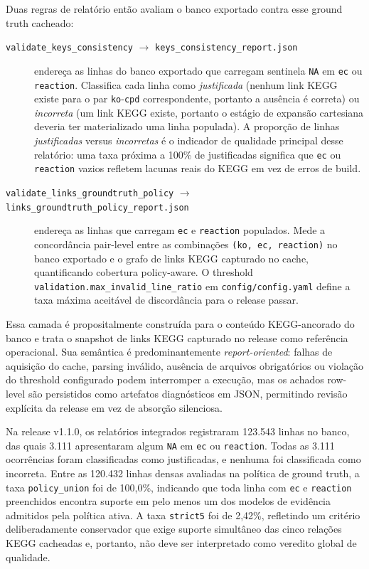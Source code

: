 Duas regras de relatório então avaliam o banco exportado contra esse ground truth cacheado:

\begin{description}
    \item[\texttt{validate\_keys\_consistency} $\rightarrow$ \texttt{keys\_consistency\_report.json}] endereça as linhas do banco exportado que carregam sentinela \texttt{NA} em \texttt{ec} ou \texttt{reaction}. Classifica cada linha como \textit{justificada} (nenhum link KEGG existe para o par \texttt{ko}-\texttt{cpd} correspondente, portanto a ausência é correta) ou \textit{incorreta} (um link KEGG existe, portanto o estágio de expansão cartesiana deveria ter materializado uma linha populada). A proporção de linhas \textit{justificadas} versus \textit{incorretas} é o indicador de qualidade principal desse relatório: uma taxa próxima a 100\% de justificadas significa que \texttt{ec} ou \texttt{reaction} vazios refletem lacunas reais do KEGG em vez de erros de build.

    \item[\texttt{validate\_links\_groundtruth\_policy} $\rightarrow$ \texttt{links\_groundtruth\_policy\_report.json}] endereça as linhas que carregam \texttt{ec} e \texttt{reaction} populados. Mede a concordância pair-level entre as combinações \texttt{(ko, ec, reaction)} no banco exportado e o grafo de links KEGG capturado no cache, quantificando cobertura policy-aware. O threshold \texttt{validation.max\_invalid\_line\_ratio} em \texttt{config/config.yaml} define a taxa máxima aceitável de discordância para o release passar.
\end{description}

Essa camada é propositalmente construída para o conteúdo KEGG-ancorado do banco e trata o snapshot de links KEGG capturado no release como referência operacional. Sua semântica é predominantemente \textit{report-oriented}: falhas de aquisição do cache, parsing inválido, ausência de arquivos obrigatórios ou violação do threshold configurado podem interromper a execução, mas os achados row-level são persistidos como artefatos diagnósticos em JSON, permitindo revisão explícita da release em vez de absorção silenciosa.

Na release v1.1.0, os relatórios integrados registraram 123.543 linhas no banco, das quais 3.111 apresentaram algum \texttt{NA} em \texttt{ec} ou \texttt{reaction}. Todas as 3.111 ocorrências foram classificadas como justificadas, e nenhuma foi classificada como incorreta. Entre as 120.432 linhas densas avaliadas na política de ground truth, a taxa \texttt{policy\_union} foi de 100,0\%, indicando que toda linha com \texttt{ec} e \texttt{reaction} preenchidos encontra suporte em pelo menos um dos modelos de evidência admitidos pela política ativa. A taxa \texttt{strict5} foi de 2,42\%, refletindo um critério deliberadamente conservador que exige suporte simultâneo das cinco relações KEGG cacheadas e, portanto, não deve ser interpretado como veredito global de qualidade.

